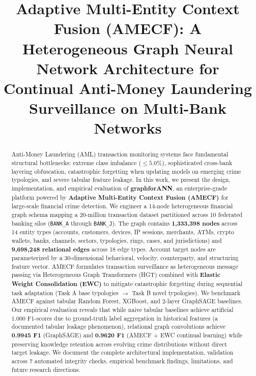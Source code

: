 \documentclass[conference]{IEEEtran}
\begin{document}
\title{Adaptive Multi-Entity Context Fusion (AMECF): A Heterogeneous Graph Neural Network Architecture for Continual Anti-Money Laundering Surveillance on Multi-Bank Networks}

\author{
}

\maketitle

\begin{abstract}
Anti-Money Laundering (AML) transaction monitoring systems face fundamental structural bottlenecks: extreme class imbalance ($\le 5.0\%$), sophisticated cross-bank layering obfuscation, catastrophic forgetting when updating models on emerging crime typologies, and severe tabular feature leakage. In this work, we present the design, implementation, and empirical evaluation of \textbf{graphforANN}, an enterprise-grade platform powered by \textbf{Adaptive Multi-Entity Context Fusion (AMECF)} for large-scale financial crime detection. We engineer a 14-node heterogeneous financial graph schema mapping a 20-million transaction dataset partitioned across 10 federated banking silos (\texttt{BANK\_A} through \texttt{BANK\_J}). The graph contains \textbf{1,333,398 nodes} across 14 entity types (accounts, customers, devices, IP sessions, merchants, ATMs, crypto wallets, banks, channels, sectors, typologies, rings, cases, and jurisdictions) and \textbf{9,698,248 relational edges} across 18 edge types. Account target nodes are parameterized by a 30-dimensional behavioral, velocity, counterparty, and structuring feature vector. AMECF formulates transaction surveillance as heterogeneous message passing via Heterogeneous Graph Transformers (HGT) combined with \textbf{Elastic Weight Consolidation (EWC)} to mitigate catastrophic forgetting during sequential task adaptation (Task A base typologies $\to$ Task B novel typologies). We benchmark AMECF against tabular Random Forest, XGBoost, and 2-layer GraphSAGE baselines. Our empirical evaluation reveals that while naive tabular baselines achieve artificial $1.000$ F1-scores due to ground-truth label aggregation in historical features (a documented tabular leakage phenomenon), relational graph convolutions achieve \textbf{0.9945 F1} (GraphSAGE) and \textbf{0.9620 F1} (AMECF + EWC continual learning) while preserving knowledge retention across evolving crime distributions without direct target leakage. We document the complete architectural implementation, validation across 7 automated integrity checks, empirical benchmark findings, limitations, and future research directions.
\end{abstract}
\end{document}
